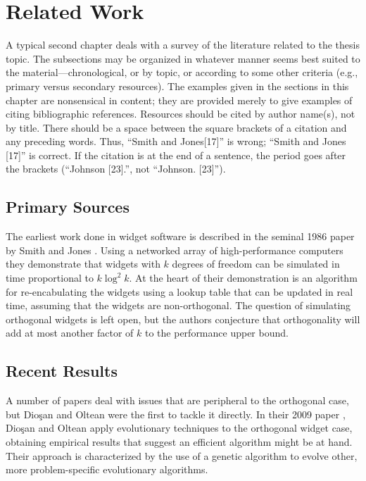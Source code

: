 %
%
\chapter{Related Work}\label{ch:relatedwork}

A typical second chapter deals with a survey of the literature
related to the thesis topic. The subsections may be organized in whatever
manner seems best suited to the material---chronological, or by topic, or
according to some other criteria (e.g., primary versus secondary resources).
The examples given in the sections in this chapter are nonsensical in content;
they are provided merely to give examples of citing bibliographic references.
Resources should be cited by author name(s), not by title.
There should be a space between the square brackets of a citation and
any preceding words. Thus, ``Smith and Jones[17]'' is wrong; ``Smith and
Jones [17]'' is correct. If the citation is at the end of a sentence, the
period goes after the brackets (``Johnson [23].'', not ``Johnson. [23]'').

\section{Primary Sources}
The earliest work done in widget software is described in the seminal 1986
paper by Smith and Jones \cite{SmithJones86}. Using a networked array of
high-performance computers they demonstrate that widgets with $k$ degrees
of freedom can be simulated in time proportional to $k\log^2k$. At the
heart of their demonstration is an algorithm for re-encabulating the widgets
using a lookup table that can be updated in real time, assuming that
the widgets are non-orthogonal. The question of simulating orthogonal widgets
is left open, but the authors conjecture that orthogonality will add at
most another factor of $k$ to the performance upper bound.


\section{Recent Results}
A number of papers \cite{blum67,damon:95,zobel:97} deal with issues
that are peripheral to the orthogonal case, but Dio\c{s}an and Oltean
were the first to tackle it directly.
In their 2009 paper \cite{diosan09}, 
Dio\c{s}an and Oltean apply evolutionary techniques to
the orthogonal widget case, obtaining empirical results that suggest
an efficient algorithm might be at hand. Their
approach is characterized by the use of a genetic algorithm to evolve other,
more problem-specific evolutionary algorithms. 

